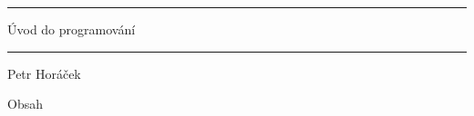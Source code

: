 \nopagenumbers

\hrule width 6in
\tit Úvod do programování
\hrule width 6in

\vskip 10mm
\hfil Petr Horáček\hfil

\newpage

\nonum\notoc\sec Obsah
\maketoc
\newpage

\pagenumbers
